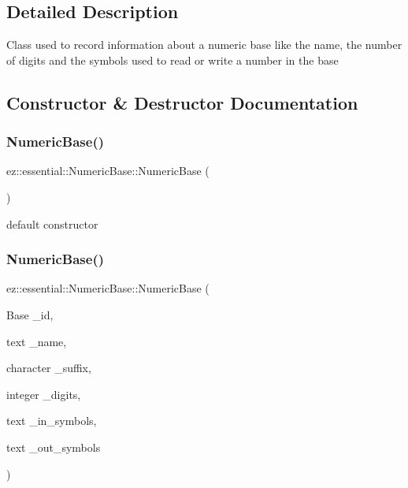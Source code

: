 \subsection{Detailed Description}
Class used to record information about a numeric base like the name, the number of digits and the symbols used to read or write a number in the base 

\subsection{Constructor \& Destructor Documentation}
\mbox{\label{classez_1_1essential_1_1NumericBase_a816e881082f2b93889da1790974a486b}} 
\subsubsection{\texorpdfstring{Numeric\+Base()}{NumericBase()}\hspace{0.1cm}{\footnotesize\ttfamily [1/2]}}
{\footnotesize\ttfamily ez\+::essential\+::\+Numeric\+Base\+::\+Numeric\+Base (\begin{DoxyParamCaption}{ }\end{DoxyParamCaption})\hspace{0.3cm}{\ttfamily [inline]}}

default constructor \mbox{\label{classez_1_1essential_1_1NumericBase_a156c1bbfb6ae7aa7e43c2bcd10e6bed4}} 
\subsubsection{\texorpdfstring{Numeric\+Base()}{NumericBase()}\hspace{0.1cm}{\footnotesize\ttfamily [2/2]}}
{\footnotesize\ttfamily ez\+::essential\+::\+Numeric\+Base\+::\+Numeric\+Base (\begin{DoxyParamCaption}\item[{Base}]{\+\_\+id,  }\item[{text}]{\+\_\+name,  }\item[{character}]{\+\_\+suffix,  }\item[{integer}]{\+\_\+digits,  }\item[{text}]{\+\_\+in\+\_\+symbols,  }\item[{text}]{\+\_\+out\+\_\+symbols }\end{DoxyParamCaption})\hspace{0.3cm}{\ttfamily [inline]}}

